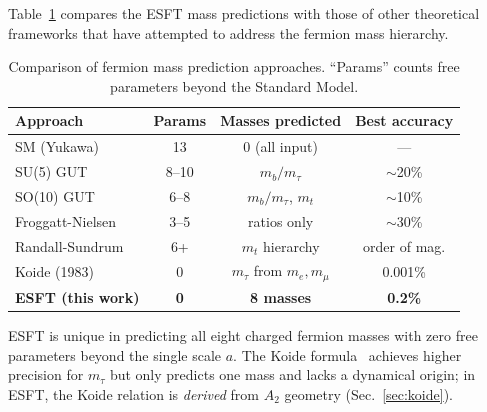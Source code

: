 ﻿\documentclass[twocolumn,preprintnumbers,amsmath,amssymb,prd]{revtex4-2}
\begin{document}
Table~\ref{tab:comparison} compares the ESFT mass predictions with those of other theoretical frameworks that have attempted to address the fermion mass hierarchy.

\begin{table}[h]
\caption{Comparison of fermion mass prediction approaches. ``Params'' counts free parameters beyond the Standard Model.}
\label{tab:comparison}
\begin{ruledtabular}
\begin{tabular}{lccc}
Approach & Params & Masses predicted & Best accuracy \\
\hline
SM (Yukawa) & 13 & 0 (all input) & --- \\
SU(5) GUT & 8--10 & $m_b/m_\tau$ & $\sim$20\% \\
SO(10) GUT & 6--8 & $m_b/m_\tau$, $m_t$ & $\sim$10\% \\
Froggatt-Nielsen & 3--5 & ratios only & $\sim$30\% \\
Randall-Sundrum & 6+ & $m_t$ hierarchy & order of mag. \\
Koide (1983) & 0 & $m_\tau$ from $m_e, m_\mu$ & 0.001\% \\
\textbf{ESFT (this work)} & \textbf{0} & \textbf{8 masses} & \textbf{0.2\%} \\
\end{tabular}
\end{ruledtabular}
\end{table}

ESFT is unique in predicting all eight charged fermion masses with zero free parameters beyond the single scale $a$. The Koide formula~\cite{Koide1983} achieves higher precision for $m_\tau$ but only predicts one mass and lacks a dynamical origin; in ESFT, the Koide relation is \emph{derived} from $A_2$ geometry (Sec.~\ref{sec:koide}).
\end{document}
